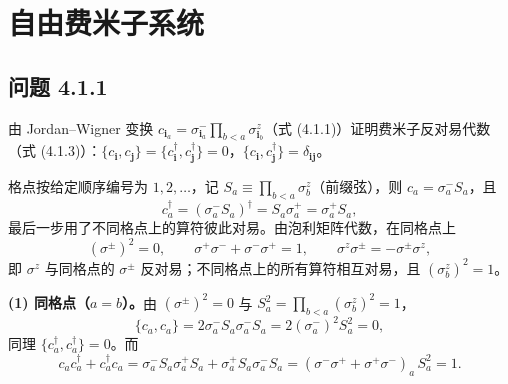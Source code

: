 \chapter{自由费米子系统}

\section*{问题 4.1.1}
\begin{problem}
由 Jordan--Wigner 变换 $c_{\pmb{i}_a}=\sigma^-_{\pmb{i}_a}\prod_{b<a}\sigma^z_{\pmb{i}_b}$（式 (4.1.1)）证明费米子反对易代数（式 (4.1.3)）：$\{c_{\pmb{i}},c_{\pmb{j}}\}=\{c^\dagger_{\pmb{i}},c^\dagger_{\pmb{j}}\}=0$，$\{c_{\pmb{i}},c^\dagger_{\pmb{j}}\}=\delta_{\pmb{i}\pmb{j}}$。
\end{problem}
\solution
格点按给定顺序编号为 $1,2,\ldots$，记 $S_a\equiv\prod_{b<a}\sigma^z_b$（前缀弦），则 $c_a=\sigma^-_a S_a$，且
\begin{equation*}
c_a^\dagger=(\sigma^-_aS_a)^\dagger=S_a\sigma^+_a=\sigma^+_aS_a,
\end{equation*}
最后一步用了不同格点上的算符彼此对易。由泡利矩阵代数，在同格点上
\begin{equation*}
(\sigma^{\pm})^2=0,\qquad
\sigma^+\sigma^-+\sigma^-\sigma^+=1,\qquad
\sigma^z\sigma^\pm=-\sigma^\pm\sigma^z,
\end{equation*}
即 $\sigma^z$ 与同格点的 $\sigma^\pm$ 反对易；不同格点上的所有算符相互对易，且 $(\sigma^z_b)^2=1$。

\textbf{(1) 同格点（$a=b$）。}由 $(\sigma^{\pm})^2=0$ 与 $S_a^2=\prod_{b<a}(\sigma^z_b)^2=1$，
\begin{equation*}
\{c_a,c_a\}=2\sigma^-_aS_a\sigma^-_aS_a=2(\sigma^-_a)^2S_a^2=0,
\end{equation*}
同理 $\{c_a^\dagger,c_a^\dagger\}=0$。而
\begin{equation*}
c_ac_a^\dagger+c_a^\dagger c_a
=\sigma^-_aS_a\sigma^+_aS_a+\sigma^+_aS_a\sigma^-_aS_a
=(\sigma^-\sigma^++\sigma^+\sigma^-)_a\,S_a^2=1 .
\end{equation*}

